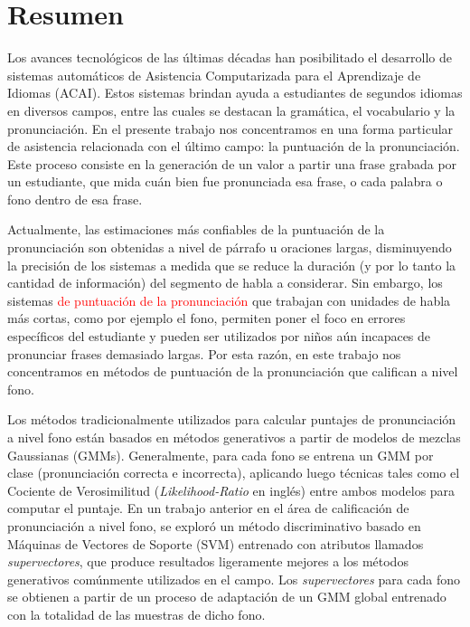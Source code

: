 \chapter*{Resumen}

Los avances tecnológicos de las últimas décadas han
posibilitado el desarrollo de sistemas
automáticos de Asistencia Computarizada para el Aprendizaje de Idiomas (ACAI).
Estos sistemas brindan ayuda a estudiantes de segundos idiomas
en diversos campos, entre las cuales se destacan la gramática, el vocabulario
y la pronunciación. En el presente trabajo nos concentramos en una forma
particular de asistencia relacionada con el último campo: la puntuación
de la pronunciación. Este proceso consiste en la generación de un valor
a partir una frase grabada por un estudiante, que mida cuán bien
fue pronunciada esa frase,
o cada palabra o fono dentro de esa frase.

Actualmente, las estimaciones más confiables de la puntuación de la pronunciación
son obtenidas a nivel de párrafo u oraciones largas, disminuyendo la precisión
de los sistemas a medida que se reduce la duración
(y por lo tanto la cantidad de información) del segmento de habla a considerar.
Sin embargo, los sistemas \textcolor{red}{de puntuación de la pronunciación}
que trabajan con unidades de habla
más cortas, como por ejemplo el fono,
permiten poner el foco en errores específicos del estudiante y
pueden ser utilizados por niños aún incapaces de pronunciar frases
demasiado largas. Por esta razón,
en este trabajo nos concentramos en métodos de puntuación de la pronunciación
que califican a nivel fono.

Los métodos tradicionalmente utilizados para calcular
puntajes de pronunciación a nivel fono
están basados en métodos generativos a partir de
modelos de mezclas Gaussianas (GMMs). Generalmente,
para cada fono se
entrena un GMM por clase (pronunciación correcta e incorrecta),
aplicando luego técnicas tales como el Cociente de
Verosimilitud (\textit{Likelihood-Ratio} en inglés) entre ambos modelos para
computar el puntaje. En un trabajo anterior en
el área de calificación de pronunciación a nivel fono,
se exploró
un método discriminativo basado en Máquinas de Vectores de Soporte (SVM) entrenado
con atributos llamados \textit{supervectores}, que produce resultados
ligeramente mejores a los métodos generativos comúnmente utilizados en el campo.
Los \textit{supervectores} para cada fono se obtienen
a partir de un proceso de adaptación de un
GMM global entrenado con la totalidad
de las muestras de dicho fono.

